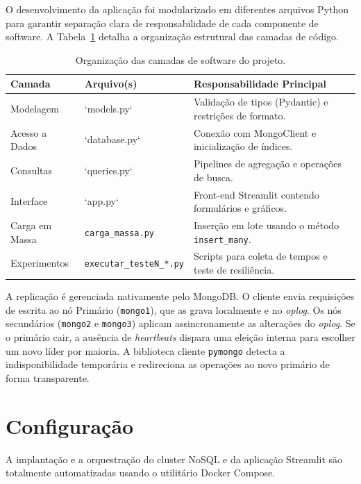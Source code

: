 \documentclass[12pt]{article}
\begin{document}
O desenvolvimento da aplicação foi modularizado em diferentes arquivos Python para garantir separação clara de responsabilidade de cada componente de software. A Tabela~\ref{tab:camadas} detalha a organização estrutural das camadas de código.

\begin{table}[ht]
\centering
\caption{Organização das camadas de software do projeto.}
\label{tab:camadas}
\small
\begin{tabular}{llp{7cm}}
\toprule
\textbf{Camada} & \textbf{Arquivo(s)} & \textbf{Responsabilidade Principal} \\
\midrule
Modelagem & `models.py` & Validação de tipos (Pydantic) e restrições de formato. \\
Acesso a Dados & `database.py` & Conexão com MongoClient e inicialização de índices. \\
Consultas & `queries.py` & Pipelines de agregação e operações de busca. \\
Interface & `app.py` & Front-end Streamlit contendo formulários e gráficos. \\
Carga em Massa & \texttt{carga\_massa.py} & Inserção em lote usando o método \texttt{insert\_many}. \\
Experimentos & \texttt{executar\_testeN\_*.py} & Scripts para coleta de tempos e teste de resiliência. \\
\bottomrule
\end{tabular}
\end{table}

A replicação é gerenciada nativamente pelo MongoDB. O cliente envia requisições de escrita ao nó Primário (\texttt{mongo1}), que as grava localmente e no \textit{oplog}. Os nós secundários (\texttt{mongo2} e \texttt{mongo3}) aplicam assincronamente as alterações do \textit{oplog}. Se o primário cair, a ausência de \textit{heartbeats} dispara uma eleição interna para escolher um novo líder por maioria. A biblioteca cliente \texttt{pymongo} detecta a indisponibilidade temporária e redireciona as operações ao novo primário de forma transparente.

\section{Configuração}
\label{sec:configuracao}

A implantação e a orquestração do cluster NoSQL e da aplicação Streamlit são totalmente automatizadas usando o utilitário Docker Compose.
\end{document}
